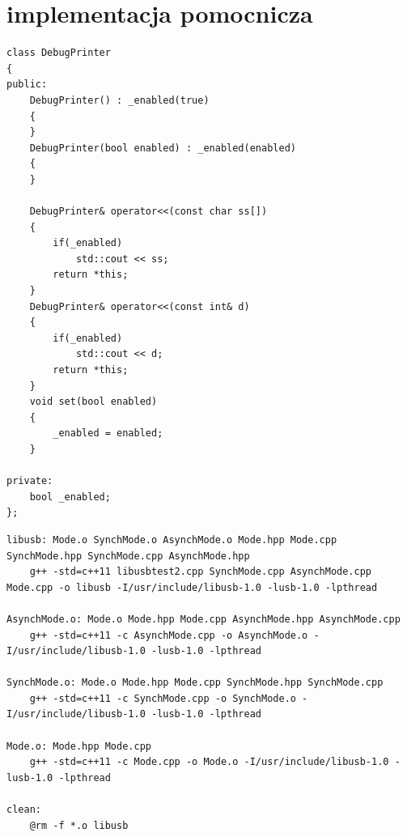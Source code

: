 \documentclass{BscUS}
\begin{document}
\section{implementacja pomocnicza}
\begin{lstlisting}[caption={Klasa DebugPrinter},label={lst:CDebugPrinter}]
class DebugPrinter
{
public:
	DebugPrinter() : _enabled(true)
	{
	}
	DebugPrinter(bool enabled) : _enabled(enabled)
	{
	}
	
	DebugPrinter& operator<<(const char ss[])
	{
		if(_enabled)
			std::cout << ss;
		return *this;
	}
	DebugPrinter& operator<<(const int& d)
	{
		if(_enabled)
			std::cout << d;
		return *this;
	}
	void set(bool enabled)
	{
		_enabled = enabled;
	}

private:
	bool _enabled;
};
\end{lstlisting}

\begin{lstlisting}[caption={Makefile},label={lst:makefile}]
libusb: Mode.o SynchMode.o AsynchMode.o Mode.hpp Mode.cpp SynchMode.hpp SynchMode.cpp AsynchMode.hpp
	g++ -std=c++11 libusbtest2.cpp SynchMode.cpp AsynchMode.cpp Mode.cpp -o libusb -I/usr/include/libusb-1.0 -lusb-1.0 -lpthread

AsynchMode.o: Mode.o Mode.hpp Mode.cpp AsynchMode.hpp AsynchMode.cpp
	g++ -std=c++11 -c AsynchMode.cpp -o AsynchMode.o -I/usr/include/libusb-1.0 -lusb-1.0 -lpthread

SynchMode.o: Mode.o Mode.hpp Mode.cpp SynchMode.hpp SynchMode.cpp
	g++ -std=c++11 -c SynchMode.cpp -o SynchMode.o -I/usr/include/libusb-1.0 -lusb-1.0 -lpthread

Mode.o: Mode.hpp Mode.cpp
	g++ -std=c++11 -c Mode.cpp -o Mode.o -I/usr/include/libusb-1.0 -lusb-1.0 -lpthread

clean:
	@rm -f *.o libusb
\end{lstlisting}
\end{document}
